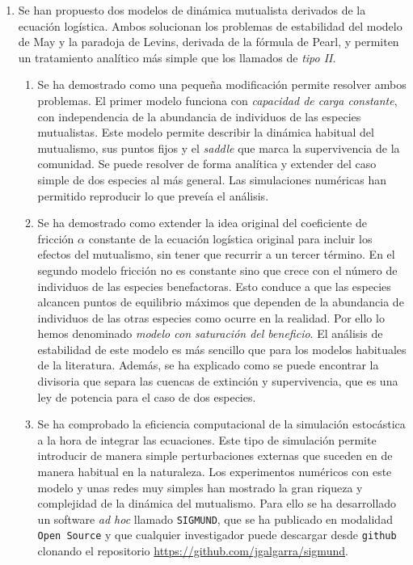 \begin{enumerate}
\item Se han propuesto dos modelos de dinámica mutualista derivados de la ecuación logística. Ambos solucionan los problemas de estabilidad del modelo de May y la paradoja de Levins, derivada de la fórmula de Pearl, y permiten un tratamiento analítico más simple que los llamados de \textit{tipo II}.
	\begin{enumerate}
	\item Se ha demostrado como una pequeña modificación permite resolver ambos problemas. El primer modelo funciona con \textit{capacidad de carga constante}, con independencia de la abundancia de individuos de las especies mutualistas. Este modelo permite describir la dinámica habitual del mutualismo, sus puntos fijos y el \textit{saddle} que marca la supervivencia de la comunidad. Se puede resolver de forma analítica y extender del caso simple de dos especies al más general. Las simulaciones numéricas han permitido reproducir lo que preveía el análisis.
	\item Se ha demostrado como extender la idea original del coeficiente de fricción $\alpha$ constante de la ecuación logística original para incluir los efectos del mutualismo, sin tener que recurrir a un tercer término. En el segundo modelo fricción no es constante sino que crece con el número de individuos de las especies benefactoras. Esto conduce a que las especies alcancen puntos de equilibrio máximos que dependen de la abundancia de individuos de las otras especies como ocurre en la realidad. Por ello lo hemos denominado \textit{modelo con saturación del beneficio}. 
	El análisis de estabilidad de este modelo es más sencillo que para los modelos habituales de la literatura. Además, se ha explicado como se puede encontrar la divisoria que separa las cuencas de extinción y supervivencia, que es una ley de potencia para el caso de dos especies.
	\item Se ha comprobado la eficiencia computacional de la simulación estocástica a la hora de integrar las ecuaciones. Este tipo de simulación permite introducir de manera simple perturbaciones externas que suceden en de manera habitual en la naturaleza. Los experimentos numéricos con este modelo y unas redes muy simples han mostrado la gran riqueza y complejidad de la dinámica del mutualismo. Para ello se ha desarrollado un software \textit{ad hoc} llamado \texttt{SIGMUND}, que se ha publicado en modalidad \texttt{Open Source} y que cualquier investigador puede descargar desde \texttt{github} clonando el repositorio \url{https://github.com/jgalgarra/sigmund}.
	\end{enumerate}
	


\end{enumerate}
